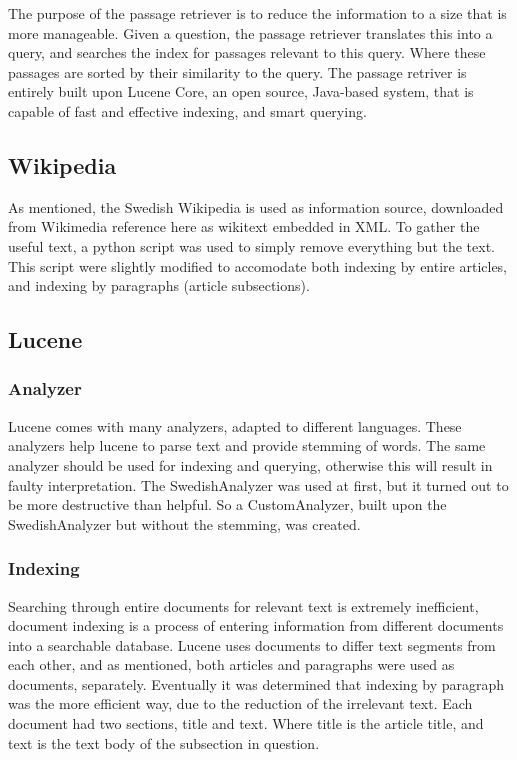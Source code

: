The purpose of the passage retriever is to reduce the information to a size that is more manageable.
Given a question, the passage retriever translates this into a query, and searches the index for passages 
relevant to this query. Where these passages are sorted by their similarity to the query.
The passage retriver is entirely built upon Lucene Core, an open source, Java-based system, 
that is capable of fast and effective indexing, and smart querying.

\subsection{Wikipedia}
As mentioned, the Swedish Wikipedia is used as information source, downloaded from Wikimedia {reference here} as wikitext embedded in XML.
To gather the useful text, a python script was used to simply remove everything but the text. 
This script were slightly modified to accomodate both indexing by entire articles, and indexing by paragraphs (article subsections).

\subsection{Lucene}

\subsubsection{Analyzer}
Lucene comes with many analyzers, adapted to different languages. 
These analyzers help lucene to parse text and provide stemming of words.
The same analyzer should be used for indexing and querying, otherwise this will result in faulty interpretation.
The SwedishAnalyzer was used at first, but it turned out to be more destructive than helpful. 
So a CustomAnalyzer, built upon the SwedishAnalyzer but without the stemming, was created.

\subsubsection{Indexing}
Searching through entire documents for relevant text is extremely inefficient, 
document indexing is a process of entering information from different documents into a searchable database. 
Lucene uses documents to differ text segments from each other, and as mentioned, both articles and paragraphs were used as documents, separately.
Eventually it was determined that indexing by paragraph was the more efficient way, due to the reduction of the irrelevant text.
Each document had two sections, title and text. Where title is the article title, and text is the text body of the subsection in question.


